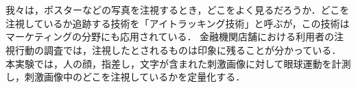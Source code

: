 \chapter{\kadaid}
\section{\purpose}
我々は，ポスターなどの写真を注視するとき，どこをよく見るだろうか．どこを注視しているか追跡する技術を「アイトラッキング技術」と呼ぶが，この技術はマーケティングの分野にも応用されている．
金融機関店舗における利用者の注視行動の調査\cite{アイトラッキング技術を用いた地域実践的研究の報告}では，注視したとされるものは印象に残ることが分かっている．
本実験では，人の顔，指差し，文字が含まれた刺激画像に対して眼球運動を計測し，刺激画像中のどこを注視しているかを定量化する．
\section{\method}
